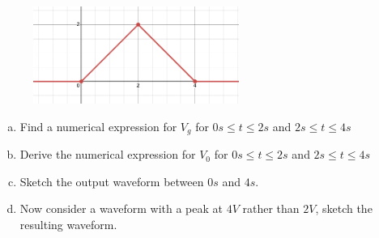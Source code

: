 \documentclass[12pt]{article}
\begin{document}
\begin{figure}[!h]
  \centering 
  \includegraphics[clip,width=0.6\textwidth]{mid2_4a.png}
\end{figure}

\begin{enumerate}[(a)]
\item Find a numerical expression for $V_g$ for $0s \leq t \leq 2s$ and $2s \leq t \leq 4s$
\item Derive the numerical expression for $V_0$ for $0s \leq t \leq 2s$ and $2s \leq t \leq 4s$
\item Sketch the output waveform between $0s$ and $4s$.
\item Now consider a waveform with a peak at $4V$ rather than $2V$, sketch the resulting waveform.
\end{enumerate}
\newpage
\end{document}
